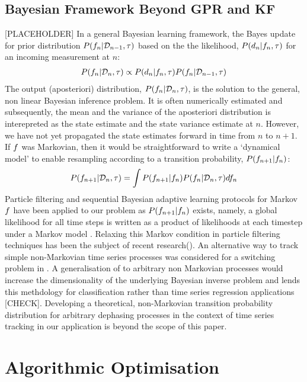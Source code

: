 \subsection{Bayesian Framework Beyond GPR and KF}
[PLACEHOLDER]
In a general Bayesian learning framework, the Bayes update for prior distribution $P(f_n | \mathcal{D}_{n-1}, \tau)$ based on the the likelihood, $P(d_n | f_n, \tau)$ for an incoming measurement at $n$: 
\begin{align}
P(f_n| \mathcal{D}_n, \tau)  \propto P(d_n | f_n, \tau) P(f_n | \mathcal{D}_{n-1}, \tau)
\end{align}
The output (aposteriori) distribution, $P(f_n| \mathcal{D}_n, \tau)$, is the solution to the general, non linear Bayesian inference problem. It is often numerically estimated and subsequently, the mean and the variance of the aposteriori distribution is interepreted as the state estimate and the state variance estimate at $n$. However, we have not yet propagated the state estimates forward in time from $n$ to $n+1$. If $f$ was Markovian, then it would be straightforward to write a `dynamical model' to enable resampling according to a transition probability, $P(f_{n+1} | f_n)$:
\begin{align}
P(f_{n+1} | \mathcal{D}_{n}, \tau) = \int P(f_{n+1} | f_n) P(f_n | \mathcal{D}_{n}, \tau) df_n
\end{align}
Particle filtering and sequential Bayesian adaptive learning protocols for Markov $f$ have been applied to our problem as $ P(f_{n+1} | f_n)$ exists, namely, a global likelihood for all time steps is written as a product of likelihoods at each timestep under a Markov model \cite{ferrie2013, wiebe2015}. Relaxing this Markov condition in particle filtering techniques has been the subject of recent research(\cite{wiebe2015bayesian, jacob2016}). An alternative way to track simple non-Markovian time series processes was considered for a switching problem in \cite{rogers2017}. A generalisation of \cite{rogers2017} to arbitrary non Markovian processes would increase the dimensionality of the underlying Bayesian inverse problem and lends this methdology for classification rather than time series regression applications [CHECK]. Developing a theoretical, non-Markovian transition probability distribution for arbitrary dephasing processes in the context of time series tracking in our application is beyond the scope of this paper. 

\section{Algorithmic Optimisation \label{sec:main:Optimisation}}

